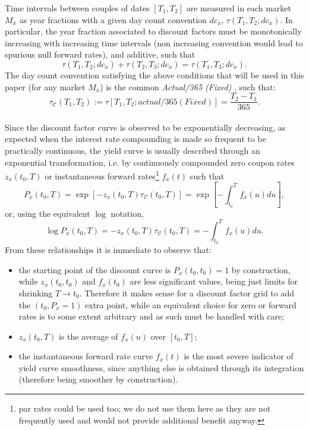 \documentclass[11pt,reqno]{amsart}
\begin{document}
Time intervals between couples of dates $\left[T_{1},T_{2}\right]$ are measured in each market $M_{x}$ as year fractions with a given day count convention $dc_x$, $\tau\left(T_{1},T_{2};dc_x\right)$.
In particular, the year fraction associated to discount factors must be monotonically increasing with increasing time intervals (non increasing convention would lead to spurious null forward rates), and additive, such that
\begin{equation}
\tau\left(T_{1},T_{2};dc_x\right) + \tau\left(T_{2},T_{3};dc_x\right)
= \tau\left(T_{1},T_{3};dc_x\right).
\end{equation}
The day count convention satisfying the above conditions that will be used in this paper (for any market $M_x$) is the common \emph{Actual/365 (Fixed)} \cite{ISDA}, such that:
\begin{equation}
\tau_{\mathcal{C}}\left(T_{1},T_{2}\right)
:= \tau\left[T_{1},T_{2};actual/365 (Fixed)\right]
= \frac{T_2-T_1}{365}.
\end{equation}
\\
Since the discount factor curve is observed to be exponentially decreasing, as expected when the interest rate compounding is made so frequent to be practically continuous, the yield curve is usually described through an exponential transformation, i.e. by continuously compounded zero coupon rates $z_x(t_0,T)$ or instantaneous forward rates\footnote{par rates could be used too; we do not use them here as they are not frequently used and would not provide additional benefit anyway.} $f_x(t)$ such that
\begin{equation}
P_x(t_0,T)
= \exp\left[-z_x\left(t_0,T\right)\tau_{\mathcal{C}}\left(t_0,T\right)\right]
= \exp\left[-\int_{t_0}^{T}f_x\left(u\right)du\right],
\label{eqn:relationship}
\end{equation}
or, using the equivalent $\log$ notation,
\begin{equation}
\log P_x(t_0,T)
= -z_x\left(t_0,T\right)\tau_{\mathcal{C}}\left(t_0,T\right)
= -\int_{t_0}^{T}f_x\left(u\right)du.
\label{eqn:logrelationship}
\end{equation}
From these relationships it is immediate to observe that:
\begin{itemize}
\item the starting point of the discount curve is $P_x(t_0,t_0)=1$ by construction, while $z_x\left(t_0,t_0\right) $ and $f_x\left(t_0\right)$ are less significant values, being just limits for shrinking $T\rightarrow t_0$. Therefore it makes sense for a discount factor grid to add the $\left(t_0,P_x=1\right)$ extra point, while an equivalent choice for zero or forward rates is to some extent arbitrary and as such must be handled with care;
\item $z_x\left(t_0,T\right)$ is the average of $f_x\left(u\right)$ over $\left[t_0,T\right]$;
\item the instantaneous forward rate curve $f_x\left(t\right)$ is the most severe indicator of yield curve smoothness, since anything else is obtained through its integration (therefore being smoother by construction).
\end{itemize}
\end{document}
